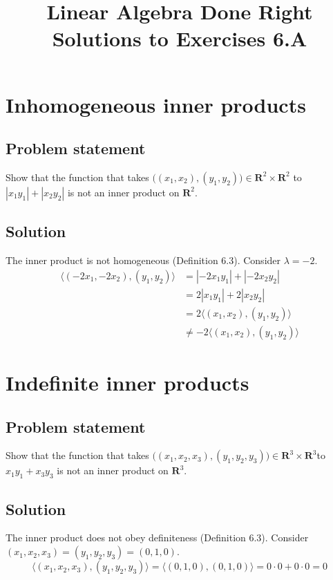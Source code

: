 \documentclass{article}
\title{Linear Algebra Done Right\\Solutions to Exercises 6.A}
\author{}
\date{}
\begin{document}
\maketitle

\section{Inhomogeneous inner products}
\subsection*{Problem statement}
Show that the function that takes $\big((x_1,x_2),(y_1,y_2)\big)\in \mathbf{R}^2\times\mathbf{R}^2$ to $|x_1y_1|+|x_2y_2|$ is not an inner product on $\mathbf{R}^2$.

\subsection*{Solution}
The inner product is not homogeneous (Definition 6.3). 
Consider $\lambda=-2$. 
\begin{align*} 
\langle(-2x_1,-2x_2),(y_1,y_2)\rangle &= |-2x_1y_1|+|-2x_2y_2| \\ 
 &= 2|x_1y_1| + 2|x_2y_2|\\
 &= 2\langle(x_1,x_2),(y_1,y_2)\rangle\\
 &\neq -2\langle(x_1,x_2),(y_1,y_2)\rangle
\end{align*}

\clearpage

\section{Indefinite inner products}
\subsection*{Problem statement}
Show that the function that takes $\big((x_1,x_2,x_3),(y_1,y_2,y_3)\big)\in \mathbf{R}^3\times\mathbf{R}^3$\newline to $x_1y_1+x_3y_3$ is not an inner product on $\mathbf{R}^3$.

\subsection*{Solution}
The inner product does not obey definiteness (Definition 6.3). 
Consider\newline $(x_1,x_2,x_3)=(y_1,y_2,y_3)=(0,1,0)$.
\[\langle(x_1,x_2,x_3),(y_1,y_2,y_3)\rangle=\langle(0,1,0),(0,1,0)\rangle=0\cdot 0+0\cdot 0=0\]
\end{document}
